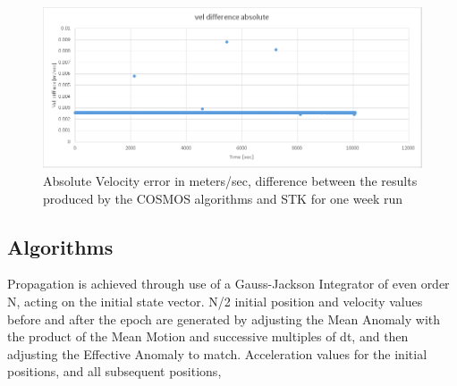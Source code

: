 \documentclass[12pt,letterpaper]{paper}
\begin{document}
\begin{figure}
\centering
\includegraphics[width=0.9\linewidth]{figures/compare_cosmos_stk_tle2gcrf_vel_error_abs}
\caption{Absolute Velocity error in meters/sec, difference between the results produced by the COSMOS algorithms and STK for one week run}
\label{fig:compare_cosmos_stk_tle2gcrf_vel_error_abs}
\end{figure}



%
%
%
%
%
%
%
%
%
%
%
\subsection{Algorithms}
Propagation is achieved through use of a Gauss-Jackson Integrator of even order N, acting on the initial state vector. N/2 initial position and velocity values before and after the epoch are generated by adjusting the Mean Anomaly with the product of the Mean Motion and successive multiples of dt, and then adjusting the Effective Anomaly to match. Acceleration values for the initial positions, and all subsequent positions, 
\end{document}
